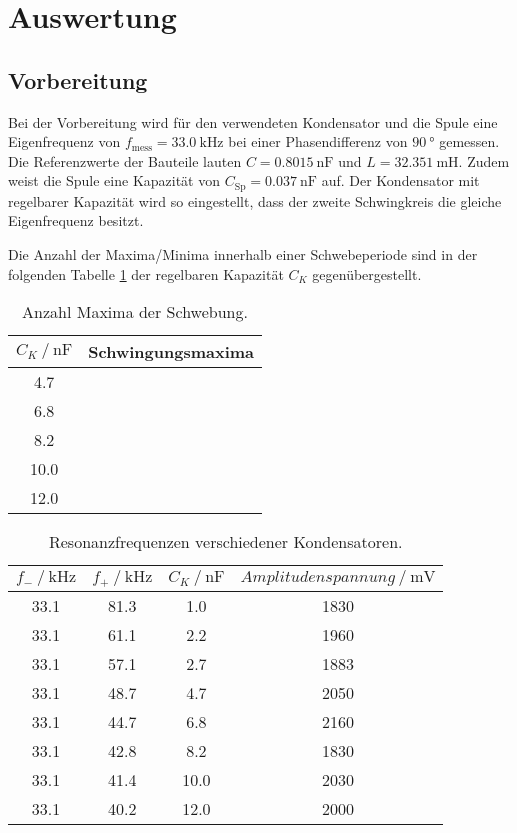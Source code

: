 \section{Auswertung}
\label{sec:Auswertung}

\subsection{Vorbereitung}
Bei der Vorbereitung wird für den verwendeten Kondensator und die Spule eine Eigenfrequenz von 
$f_{\text{mess}}=\SI{33.0}{\kilo\hertz}$ bei einer Phasendifferenz von $\SI{90}{\degree}$ gemessen. 
Die Referenzwerte der Bauteile lauten $C=\SI{0.8015}{\nano\farad}$ und $L=\SI{32.351}{\milli\henry}$. 
Zudem weist die Spule eine Kapazität von $C_\text{Sp}=\SI{0.037}{\nano\farad}$ auf.
Der Kondensator mit regelbarer Kapazität wird so eingestellt, dass der zweite Schwingkreis die gleiche Eigenfrequenz besitzt.

Die Anzahl der Maxima/Minima innerhalb einer Schwebeperiode sind in der folgenden Tabelle \ref{tab:schwing_maxima} der regelbaren Kapazität $C_K$ gegenübergestellt.

\begin{table}
    \centering
    \caption{Anzahl Maxima der Schwebung.}
    \label{tab:schwing_maxima}
    \begin{tabular}{c c}
        \toprule
        {$C_K \:/\: \si{\nano\farad}$} & Schwingungsmaxima \\
        \midrule
        4.7  & \\ 
        6.8  & \\ 
        8.2  & \\ 
        10.0 & \\ 
        12.0 & \\ 
        \bottomrule
    \end{tabular}
\end{table}



\begin{table}
    \centering
    \caption{Resonanzfrequenzen verschiedener Kondensatoren.}
    \label{tab:resonanz}
    \begin{tabular}{c c c c}
        \toprule
        $f_- \:/\: \si{\kilo\hertz}$ & $f_+ \:/\: \si{\kilo\hertz}$ & $C_K \:/\: \si{\nano\farad}$ & $Amplitudenspannung \:/\: \si{\milli\volt}$ \\
        \midrule
        33.1 & 81.3 & 1.0  & 1830 \\
        33.1 & 61.1 & 2.2  & 1960 \\
        33.1 & 57.1 & 2.7  & 1883 \\
        33.1 & 48.7 & 4.7  & 2050 \\
        33.1 & 44.7 & 6.8  & 2160 \\
        33.1 & 42.8 & 8.2  & 1830 \\
        33.1 & 41.4 & 10.0 & 2030 \\
        33.1 & 40.2 & 12.0 & 2000 \\
        \bottomrule
    \end{tabular}
\end{table}

